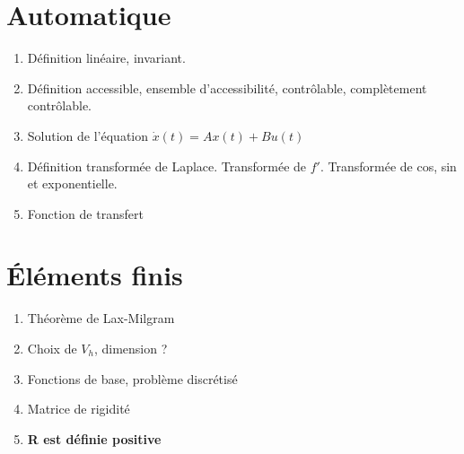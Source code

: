 \documentclass{article}
\begin{document}
\setcounter{tocdepth}{4}
\tableofcontents
\newpage

\part{Automatique}
\begin{enumerate}
\item Définition linéaire, invariant.
\item Définition accessible, ensemble d'accessibilité, contrôlable, complètement contrôlable.
\item Solution de l'équation $\dot{x}(t)=Ax(t)+Bu(t)$
\item Définition transformée de Laplace. Transformée de $f'$. Transformée de cos, sin et exponentielle.
\item Fonction de transfert
\end{enumerate}

\part{\'El\'ements finis}
\begin{enumerate}
\item Théorème de Lax-Milgram
\item Choix de $V_h$, dimension ?
\item Fonctions de base, problème discrétisé
\item Matrice de rigidité
\item \textbf{R est définie positive}
\end{enumerate}
\end{document}

